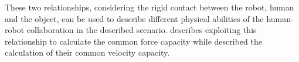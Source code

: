 These two relationships, considering the rigid contact between the robot, human and the object, can be used to describe different physical abilities of the human-robot collaboration in the described scenario.  describes exploiting this relationship to calculate the common force capacity while  described the calculation of their common velocity capacity.








